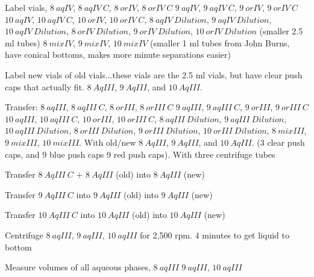 \documentclass[idxtotoc,hyperref,openany,oneside]{labbook} %
\newcommand{\cmark}{\ding{51}}%
\newcommand{\done}{\rlap{$\square$}{\raisebox{2pt}{\large\hspace{1pt}\cmark}}%
  \hspace{-2.5pt}}
\begin{document}
\begin{todolist}

\item[\done]{Label vials,
  $\boxed{8\ aqIV}$,
  $\boxed{8\ aqIV\ C}$,  $\boxed{8\ orIV}$,
  $\boxed{8\ orIV\ C}$
  $\boxed{9\ aqIV}$,  $\boxed{9\ aqIV\ C}$,  $\boxed{9\ orIV}$,
  $\boxed{9\ orIV\ C}$
  $\boxed{10\ aqIV}$, $\boxed{10\ aqIV\ C}$, $\boxed{10\ orIV}$,
  $\boxed{10\ orIV\ C}$,
  $\boxed{8\ aqIV\ Dilution}$,
  $\boxed{9\ aqIV\ Dilution}$,
  $\boxed{10\ aqIV\ Dilution}$,
  $\boxed{8\ orIV\ Dilution}$,
  $\boxed{9\ orIV\ Dilution}$,
  $\boxed{10\ orIV\ Dilution}$ (smaller 2.5 ml tubes)
  $\boxed{8\ mixIV}$, $\boxed{9\ mixIV}$,
    $\boxed{10\ mixIV}$ (smaller 1 ml tubes from John Burns,
    have conical bottoms, makes more minute separations easier)}
\item[\done]{Label new vials of old vials...these vials are the
  2.5 ml vials, but have clear push caps that actually fit.
  $\boxed{8\ AqIII}$, $\boxed{9\ AqIII}$, and $\boxed{10\ AqIII}$.}
\item[\done]{Transfer:
  $\boxed{8\ aqIII}$,  $\boxed{8\ aqIII\ C}$,  $\boxed{8\ orIII}$,
  $\boxed{8\ orIII\ C}$
  $\boxed{9\ aqIII}$,  $\boxed{9\ aqIII\ C}$,  $\boxed{9\ orIII}$,
  $\boxed{9\ orIII\ C}$
  $\boxed{10\ aqIII}$, $\boxed{10\ aqIII\ C}$, $\boxed{10\ orIII}$,
  $\boxed{10\ orIII\ C}$,
    $\boxed{8\ aqIII\ Dilution}$,
  $\boxed{9\ aqIII\ Dilution}$,
  $\boxed{10\ aqIII\ Dilution}$,
  $\boxed{8\ orIII\ Dilution}$,
  $\boxed{9\ orIII\ Dilution}$,
  $\boxed{10\ orIII\ Dilution}$,
  $\boxed{8\ mixIII}$, $\boxed{9\ mixIII}$,
  $\boxed{10\ mixIII}$. With old/new $\boxed{8\ AqIII}$, $\boxed{9\ AqIII}$, and $\boxed{10\ AqIII}$.
  (3 clear push caps, and 9 blue push caps
  9 red push caps). With three centrifuge tubes}
\item[\done]{Transfer $\boxed{8\ AqIII\ C}$ + $\boxed{8\ AqIII}$ (old)
     into $\boxed{8\ AqIII}$ (new)}
\item[\done]{Transfer $\boxed{9\ AqIII\ C}$ into $\boxed{9\ AqIII}$ (old)
     into $\boxed{9\ AqIII}$ (new)}
\item[\done]{Transfer $\boxed{10\ AqIII\ C}$ into $\boxed{10\ AqIII}$ (old)
     into $\boxed{10\ AqIII}$ (new)}
\item[\done]{Centrifuge $\boxed{8\ aqIII}$, $\boxed{9\ aqIII}$,
  $\boxed{10\ aqIII}$ for 2,500 rpm. 4 minutes to get liquid to
  bottom}
\item[\done]{Measure volumes of all aqueous phases, $\boxed{8\ aqIII}$
     $\boxed{9\ aqIII}$, $\boxed{10\ aqIII}$}
\begin{table}[H]

\end{table}
\end{todolist}
\end{document}
